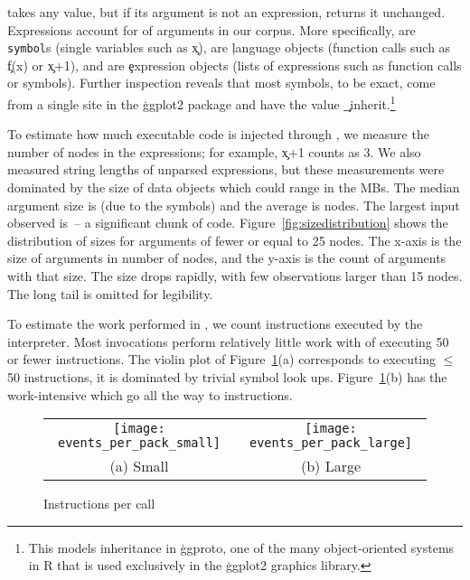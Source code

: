 \documentclass[review,nonacm,screen,acmsmall,anonymous=true]{acmart}
\begin{document}
\Eval takes any value, but if its argument is not an expression, \eval returns
it unchanged. Expressions account for \packageCodepercent of arguments in our
corpus. More specifically, \packageSymbolpercent are \texttt{symbol}s (single
variables such as \c{x}), \packageLanguagepercent are \c{language} objects
(function calls such as \c{f(x)} or \c{x+1}), and \packageExpressionpercent are
\c{expression} objects (lists of expressions such as function calls or
symbols). Further inspection reveals that most symbols,
\packageGgplotsymbolpercent to be exact, come from a single site in the
\c{ggplot2} package and have the value \c{\_inherit}.\footnote{This models
inheritance in \c{ggproto}, one of the many object-oriented systems in
R that is used exclusively in the \c{ggplot2} graphics library.}

To estimate how much executable code is injected through \eval, we measure the number of nodes in the expressions; for example, \c{x+1} counts as 3. We
also measured string lengths of unparsed expressions, but these measurements
were dominated by the size of data objects which could range in the MBs. The
median argument size is \packageMedianszeval (due to the symbols) and the
average is \packageAvgszeval nodes. The largest \eval input observed is
\packageMaxszeval\,-- a significant chunk of code.
Figure~\ref{fig:sizedistribution} shows the distribution of sizes for arguments
of fewer or equal to 25 nodes. The x-axis is the size of arguments in number of
nodes, and the y-axis is the count of arguments with that size. The size drops
rapidly, with few observations larger than 15 nodes. The long tail is omitted
for legibility.

To estimate the work performed in \evals, we count instructions executed by the
interpreter. Most invocations perform relatively little work with
\packageSmalleventspct of \evals executing 50 or fewer instructions. The violin
plot of Figure~\ref{ev}(a) corresponds to \evals executing $\leq$ 50
instructions, it is dominated by trivial symbol look ups. Figure~\ref{ev}(b) has
the work-intensive \evals which go all the way to \packageMaxeventsRnd
instructions.

\newpage

\begin{figure}[tb!]
\begin{tabular}{@{}c@{}c@{}}
\begin{minipage}{7.5cm}
 \texttt{[image: events\_per\_pack\_small]}
\end{minipage}&\begin{minipage}{7.5cm}
  \texttt{[image: events\_per\_pack\_large]}
\end{minipage}\\[-3mm]
\small (a) Small & \small (b) Large
\end{tabular}
 \caption{Instructions per call} \label{ev}
\end{figure}
\end{document}
